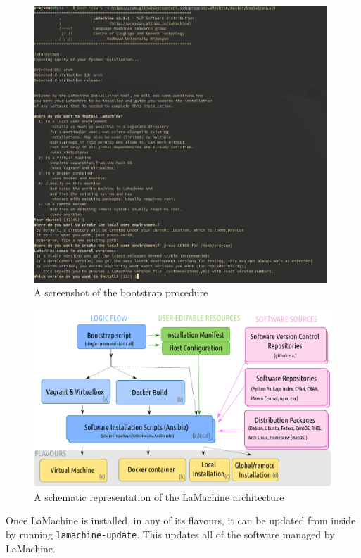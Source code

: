 \documentclass[a4paper,11pt]{article}
\begin{document}
\begin{figure}[htb] \begin{center}
\includegraphics[width=110.0mm]{screenshot_bootstrap.jpg}
\end{center}
\caption{\footnotesize{A screenshot of the bootstrap procedure}}
\label{fig:bootstrap}
\end{figure}

\begin{figure}[htb] \begin{center}
\includegraphics[width=135.0mm]{architecture.png}
\end{center}
\caption{\footnotesize{A schematic representation of the LaMachine architecture}}
\label{fig:arch}
\end{figure}

Once LaMachine is installed, in any of its flavours, it can be updated from inside by running
\texttt{lamachine-update}. This updates all of the software managed by LaMachine.
\end{document}

